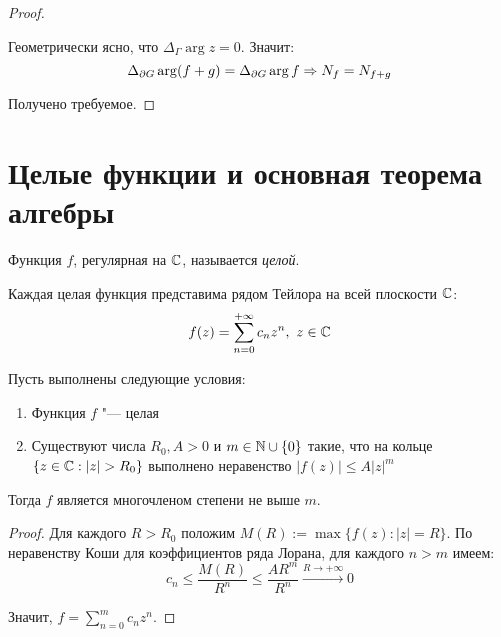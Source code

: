 \begin{proof}
\begin{center}
	\end{center}
	
	Геометрически ясно, что $\Delta_\Gamma\arg{z} = 0$. Значит:
	\[\Delta_{\partial G}\arg (f+g) = \Delta_{\partial G}\arg f \Rightarrow N_f = N_{f+g}\]
	
	Получено требуемое.
\end{proof}

\section{Целые функции и основная теорема алгебры}

\begin{definition}
	Функция $f$, регулярная на $\mathbb{C}$, называется \textit{целой}.
\end{definition}

\begin{note}
	Каждая целая функция представима рядом Тейлора на всей плоскости $\mathbb{C}$:
	\[f(z) = \sum_{n=0}^{+\infty}c_nz^n,~z \in \mathbb{C}\]
\end{note}

\begin{proposition}
	Пусть выполнены следующие условия:
	\begin{enumerate}
		\item Функция $f$ "--- целая
		\item Существуют числа $R_0, A > 0$ и $m \in \mathbb{N} \cup \{0\}$ такие, что на кольце $\{z \in \mathbb{C}: |z| > R_0\}$ выполнено неравенство $|f(z)| \le A|z|^m$
	\end{enumerate}
	
	Тогда $f$ является многочленом степени не выше $m$.
\end{proposition}

\begin{proof}
	Для каждого $R > R_0$ положим $M(R) := \max\{f(z): |z| = R\}$. По неравенству Коши для коэффициентов ряда Лорана, для каждого $n >m $ имеем:
	\[c_n \le \frac{M(R)}{R^n} \le \frac{AR^m}{R^n} \xrightarrow{R \to +\infty} 0\]
	
	Значит, $f = \sum_{n = 0}^mc_nz^n$.
\end{proof}

